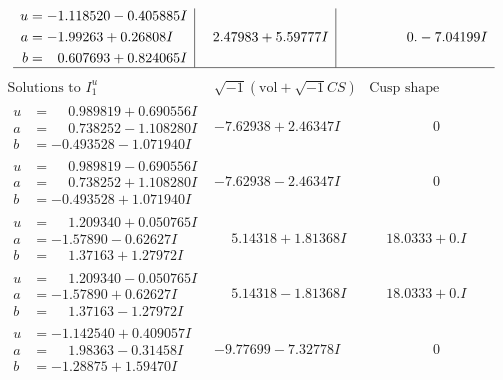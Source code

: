 \documentclass[1p]{elsarticle_modified}
\theoremstyle{definition}
\newcommand{\I}{\sqrt{-1}}
\begin{document}
$$\begin{array}{c|c|c}
\begin{aligned}
u &= -1.118520 - 0.405885 I \\
a &= -1.99263 + 0.26808 I \\
b &= \phantom{-}0.607693 + 0.824065 I\end{aligned}
 & \phantom{-}2.47983 + 5.59777 I & \phantom{-0.000000 } 0. - 7.04199 I\\
 \hline 
 \end{array}$$\newpage$$\begin{array}{c|c|c}  
\text{Solutions to }I^u_{1}& \I (\text{vol} + \sqrt{-1}CS) & \text{Cusp shape}\\
 \hline 
\begin{aligned}
u &= \phantom{-}0.989819 + 0.690556 I \\
a &= \phantom{-}0.738252 - 1.108280 I \\
b &= -0.493528 - 1.071940 I\end{aligned}
 & -7.62938 + 2.46347 I & \phantom{-0.000000 } 0 \\ \hline\begin{aligned}
u &= \phantom{-}0.989819 - 0.690556 I \\
a &= \phantom{-}0.738252 + 1.108280 I \\
b &= -0.493528 + 1.071940 I\end{aligned}
 & -7.62938 - 2.46347 I & \phantom{-0.000000 } 0 \\ \hline\begin{aligned}
u &= \phantom{-}1.209340 + 0.050765 I \\
a &= -1.57890 - 0.62627 I \\
b &= \phantom{-}1.37163 + 1.27972 I\end{aligned}
 & \phantom{-}5.14318 + 1.81368 I & \phantom{-}18.0333 + 0. I\phantom{ +0.000000I} \\ \hline\begin{aligned}
u &= \phantom{-}1.209340 - 0.050765 I \\
a &= -1.57890 + 0.62627 I \\
b &= \phantom{-}1.37163 - 1.27972 I\end{aligned}
 & \phantom{-}5.14318 - 1.81368 I & \phantom{-}18.0333 + 0. I\phantom{ +0.000000I} \\ \hline\begin{aligned}
u &= -1.142540 + 0.409057 I \\
a &= \phantom{-}1.98363 - 0.31458 I \\
b &= -1.28875 + 1.59470 I\end{aligned}
 & -9.77699 - 7.32778 I & \phantom{-0.000000 } 0 \\ \hline\begin{aligned}

\end{aligned}
\end{array}$$
\end{document}

